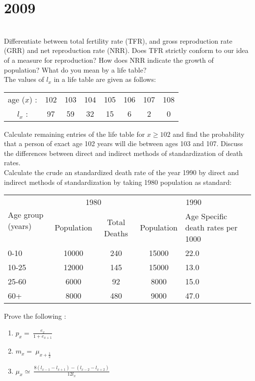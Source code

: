 \section*{2009}
\vspace{-.5cm}
\hrulefill \smallskip\\
 Differentiate between total fertility rate (TFR), and gross reproduction rate (GRR) and net reproduction rate (NRR). Does TFR strictly conform to our idea of a measure for reproduction? How does NRR indicate the growth of population? 
\myline
{} What do you mean by a life table?\\ The values of $l_x$ in a life table are given as follows:
\begin{center}
    \begin{tabular}{*{8}{c}}
    age ($x$) : & 102 & 103 & 104 & 105 & 106 & 107 & 108 \\
    $l_x$ : & 97 & 59 & 32 & 15 & 6 & 2 & 0
    \end{tabular}
\end{center} Calculate remaining entries of the life table for $x\geq102$ and find the probability that a person of exact age 102 years will die between ages 103 and 107. 
\myline
{} Discuss the differences between direct and indirect methods of standardization of death rates. \\ Calculate the crude an standardized death rate of the year 1990 by direct and indirect methods of standardization by taking 1980 population as standard:
\begin{center}
    \begin{tabular}{|p{2cm}|cc|cp{2.5cm}|}\hline
    \multirow{2}{}{Age group (years)} & \multicolumn{2}{c|}{1980} &\multicolumn{2}{c|}{1990}\\ \cline{2-5}
    & Population & Total Deaths & Population & Age Specific death rates per 1000 \\ \hline
    0-10 & 10000 & 240 & 15000 & 22.0 \\
    10-25 & 12000 & 145 & 15000 & 13.0 \\
    25-60 & 6000 & 92 & 8000 & 15.0 \\
    60+ & 8000 & 480 & 9000 & 47.0 \\ \hline
    \end{tabular}
\end{center}
\myline
{} Prove the following :
{\large
\begin{enumerate}[label=(\roman*)]
\itemsep0em 
\item $ \displaystyle p_x = \: \frac{e_x}{1 + e_{x+1}}$
\item $ \displaystyle m_x = \:\mu_{x+\frac{1}{2}}$
\item $\displaystyle \mu_x \simeq \:\frac{8(l_{x-1} - l_{x+1}) - (l_{x-2} -l_{x+2})}{12l_x}$
\end{enumerate}}
